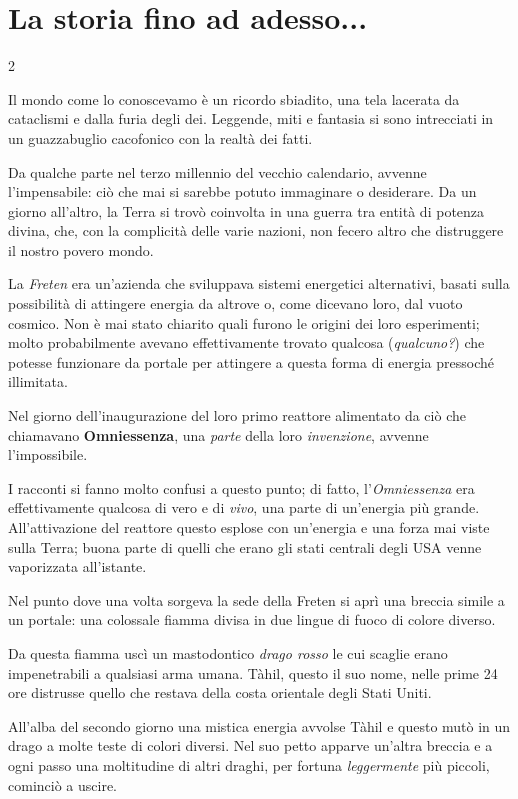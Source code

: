 \section{La storia fino ad adesso...}

\begin{multicols}{2}

Il mondo come lo conoscevamo è un ricordo sbiadito, una tela lacerata da cataclismi e dalla furia degli dei. Leggende, miti e fantasia si sono intrecciati in un guazzabuglio cacofonico con la realtà dei fatti.

Da qualche parte nel terzo millennio del vecchio calendario, avvenne l’impensabile: ciò che mai si sarebbe potuto immaginare o desiderare. Da un giorno all’altro, la Terra si trovò coinvolta in una guerra tra entità di potenza divina, che, con la complicità delle varie nazioni, non fecero altro che distruggere il nostro povero mondo.

La \emph{Freten} era un'azienda che sviluppava sistemi energetici alternativi, basati sulla possibilità di attingere energia da altrove o, come dicevano loro, dal vuoto cosmico.
Non è mai stato chiarito quali furono le origini dei loro esperimenti; molto probabilmente avevano effettivamente trovato qualcosa (\emph{qualcuno?}) che potesse funzionare da portale per attingere a questa forma di energia pressoché illimitata.

Nel giorno dell'inaugurazione del loro primo reattore alimentato da ciò che chiamavano  \textbf{Omniessenza}, una \emph{parte} della loro \emph{invenzione}, avvenne l'impossibile.

I racconti si fanno molto confusi a questo punto; di fatto, l'\emph{Omniessenza} era effettivamente qualcosa di vero e di \emph{vivo}, una parte di un'energia più grande. All'attivazione del reattore questo esplose con un'energia e una forza mai viste sulla Terra; buona parte di quelli che erano gli stati centrali degli USA venne vaporizzata all'istante.

Nel punto dove una volta sorgeva la sede della Freten si aprì una breccia simile a un portale: una colossale fiamma divisa in due lingue di fuoco di colore diverso.

Da questa fiamma uscì un mastodontico \emph{drago rosso} le cui scaglie erano impenetrabili a qualsiasi arma umana. Tàhil, questo il suo nome, nelle prime 24 ore distrusse quello che restava della costa orientale degli Stati Uniti.

All'alba del secondo giorno una mistica energia avvolse Tàhil e questo mutò in un drago a molte teste di colori diversi. Nel suo petto apparve un'altra breccia e a ogni passo una moltitudine di altri draghi, per fortuna \emph{leggermente} più piccoli, cominciò a uscire.


\end{multicols}
